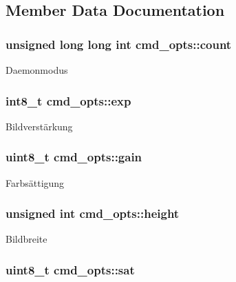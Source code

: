 \subsection{Member Data Documentation}
\hypertarget{structcmd__opts_a582f29b5e8c3328779e88bcb22ff3c2e}{
\subsubsection[{count}]{\setlength{\rightskip}{0pt plus 5cm}unsigned long long int cmd\+\_\+opts\+::count}}\label{structcmd__opts_a582f29b5e8c3328779e88bcb22ff3c2e}
Daemonmodus \hypertarget{structcmd__opts_aa6ef1ebf0fbaa8bd7016a8ef1a2c5ef4}{
\subsubsection[{exp}]{\setlength{\rightskip}{0pt plus 5cm}int8\+\_\+t cmd\+\_\+opts\+::exp}}\label{structcmd__opts_aa6ef1ebf0fbaa8bd7016a8ef1a2c5ef4}
Bildverstärkung \hypertarget{structcmd__opts_a55323cae5dfbafe672e6581da99985b9}{
\subsubsection[{gain}]{\setlength{\rightskip}{0pt plus 5cm}uint8\+\_\+t cmd\+\_\+opts\+::gain}}\label{structcmd__opts_a55323cae5dfbafe672e6581da99985b9}
Farbsättigung \hypertarget{structcmd__opts_a0ab9c9cf886559f8cf19dd2f7be072fb}{
\subsubsection[{height}]{\setlength{\rightskip}{0pt plus 5cm}unsigned int cmd\+\_\+opts\+::height}}\label{structcmd__opts_a0ab9c9cf886559f8cf19dd2f7be072fb}
Bildbreite \hypertarget{structcmd__opts_aa83f2910f6a1803ee8c9f9e3581db314}{
\subsubsection[{sat}]{\setlength{\rightskip}{0pt plus 5cm}uint8\+\_\+t cmd\+\_\+opts\+::sat}}\label{structcmd__opts_aa83f2910f6a1803ee8c9f9e3581db314}
